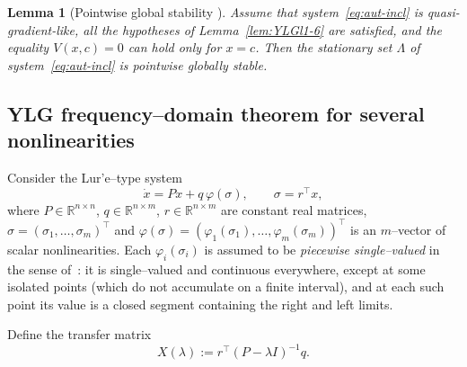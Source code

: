 \documentclass[journal]{IEEEtran}
\newtheorem{lemma}{Lemma}
\begin{document}
\begin{lemma}[Pointwise global stability {\cite[Lem.~1.7]{YLG}}]\label{lem:YLGl1-7}
Assume that system~\eqref{eq:aut-incl} is quasi-gradient-like, all the
hypotheses of Lemma~\ref{lem:YLGl1-6} are satisfied, and the equality
$V(x,c)=0$ can hold only for $x=c$.
Then the stationary set $\Lambda$ of system~\eqref{eq:aut-incl} is
pointwise globally stable.
\end{lemma}

\subsection{YLG frequency–domain theorem for several nonlinearities}

Consider the Lur'e–type system
\begin{equation}
  \dot x = P x + q\,\varphi(\sigma), 
  \qquad \sigma = r^{\top} x,
  \label{eq:YLG-31-system}
\end{equation}
where $P\in\mathbb{R}^{n\times n}$, $q\in\mathbb{R}^{n\times m}$, 
$r\in\mathbb{R}^{n\times m}$ are constant real matrices, 
$\sigma=(\sigma_1,\dots,\sigma_m)^{\top}$ and
$\varphi(\sigma)=(\varphi_1(\sigma_1),\dots,\varphi_m(\sigma_m))^{\top}$
is an $m$–vector of scalar nonlinearities.  
Each $\varphi_i(\sigma_i)$ is assumed to be \emph{piecewise single–valued}
in the sense of~\cite{YLG}: it is single–valued and continuous everywhere,
except at some isolated points (which do not accumulate on a finite
interval), and at each such point its value is a closed segment containing
the right and left limits.

Define the transfer matrix
\[
  X(\lambda) := r^{\top}(P-\lambda I)^{-1}q .
\]
\end{document}
